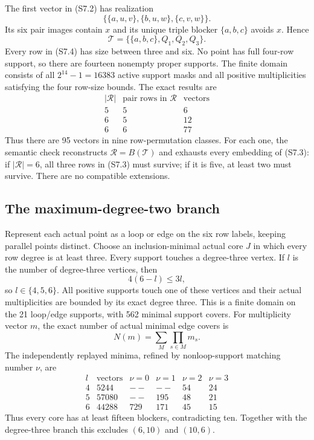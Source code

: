 \documentclass[11pt,a4paper]{article}
\theoremstyle{definition}
\newcommand{\blocker}{B}
\begin{document}
The first vector in (S7.2) has realization
\[
 \{\{a,u,v\},\{b,u,w\},\{c,v,w\}\}.      \tag{S7.3}
\]
Its six pair images contain $x$ and its unique triple blocker
$\{a,b,c\}$ avoids $x$.  Hence
\[
 \mathcal T=\{\{a,b,c\},Q_1,Q_2,Q_3\}.  \tag{S7.4}
\]
Every row in (S7.4) has size between three and six.  No point has full
four-row support, so there are fourteen nonempty proper supports.  The
finite domain consists of all $2^{14}-1=16383$ active support masks and all
positive multiplicities satisfying the four row-size bounds.  The exact
results are
\[
\begin{array}{c|c|r}
|\mathcal R|&\text{pair rows in }\mathcal R&\text{vectors}\\
\hline
5&5&6\\
6&5&12\\
6&6&77
\end{array}                                                   \tag{S7.5}
\]
Thus there are 95 vectors in nine row-permutation classes.  For each one,
the semantic check reconstructs $\mathcal R=\blocker(\mathcal T)$ and
exhausts every embedding of (S7.3): if $|\mathcal R|=6$, all three rows in
(S7.3) must survive; if it is five, at least two must survive.  There are no
compatible extensions.

\subsection{The maximum-degree-two branch}

Represent each actual point as a loop or edge on the six row labels, keeping
parallel points distinct.  Choose an inclusion-minimal actual core $J$ in
which every row degree is at least three.  Every support touches a
degree-three vertex.  If $l$ is the number of degree-three vertices, then
\[
 4(6-l)\leq3l,
\]
so $l\in\{4,5,6\}$.  All positive supports touch one of these vertices and
their actual multiplicities are bounded by its exact degree three.  This is
a finite domain on the 21 loop/edge supports, with 562 minimal support
covers.  For multiplicity vector $m$, the exact number of actual minimal edge
covers is
\[
 N(m)=\sum_M\prod_{s\in M}m_s.                              \tag{S7.6}
\]
The independently replayed minima, refined by nonloop-support matching
number $\nu$, are
\[
\begin{array}{c|r|rrrr}
l&\text{vectors}&\nu=0&\nu=1&\nu=2&\nu=3\\
\hline
4&5244&--&--&54&24\\
5&57080&--&195&48&21\\
6&44288&729&171&45&15
\end{array}                                                   \tag{S7.7}
\]
Thus every core has at least fifteen blockers, contradicting ten.  Together
with the degree-three branch this excludes $(6,10)$ and $(10,6)$.
\end{document}
